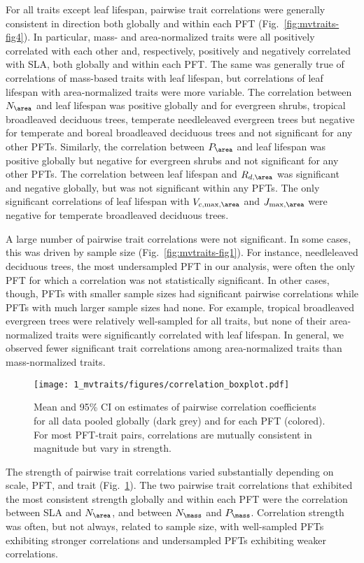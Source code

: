 For all traits except leaf lifespan, pairwise trait correlations were generally consistent in direction both globally and within each PFT (Fig.~\ref{fig:mvtraits-fig4}).
In particular, mass- and area-normalized traits were all positively correlated with each other and, respectively, positively and negatively correlated with SLA, both globally and within each PFT\@.
The same was generally true of correlations of mass-based traits with leaf lifespan, but correlations of leaf lifespan with area-normalized traits were more variable.
The correlation between $N_{\area}$ and leaf lifespan was positive globally and for evergreen shrubs, tropical broadleaved deciduous trees, temperate needleleaved evergreen trees but negative for temperate and boreal broadleaved deciduous trees and not significant for any other PFTs.
Similarly, the correlation between $P_{\area}$ and leaf lifespan was positive globally but negative for evergreen shrubs and not significant for any other PFTs.
The correlation between leaf lifespan and $R_{d,\area}$ was significant and negative globally, but was not significant within any PFTs.
The only significant correlations of leaf lifespan with $V_{c,\max,\area}$ and $J_{\max,\area}$ were negative for temperate broadleaved deciduous trees.

A large number of pairwise trait correlations were not significant.
In some cases, this was driven by sample size (Fig.~\ref{fig:mvtraits-fig1}).
For instance, needleleaved deciduous trees, the most undersampled PFT in our analysis, were often the only PFT for which a correlation was not statistically significant.
In other cases, though, PFTs with smaller sample sizes had significant pairwise correlations while PFTs with much larger sample sizes had none.
For example, tropical broadleaved evergreen trees were relatively well-sampled for all traits, but none of their area-normalized traits were significantly correlated with leaf lifespan.
In general, we observed fewer significant trait correlations among area-normalized traits than mass-normalized traits. 

\begin{figure}
  \centering
  \texttt{[image: 1\_mvtraits/figures/correlation\_boxplot.pdf]}
  \caption{%
    Mean and 95\% CI on estimates of pairwise correlation coefficients
    for all data pooled globally (dark grey) and for each PFT (colored).
    For most PFT-trait pairs, correlations are mutually consistent in magnitude but vary in strength.
  }\label{fig:mvtraits-fig5}
\end{figure}

The strength of pairwise trait correlations varied substantially depending on scale, PFT, and trait (Fig.~\ref{fig:mvtraits-fig5}).
The two pairwise trait correlations that exhibited the most consistent strength globally and within each PFT were the correlation between SLA and $N_{\area}$, and between $N_{\mass}$ and $P_{\mass}$.
Correlation strength was often, but not always, related to sample size, with well-sampled PFTs exhibiting stronger correlations and undersampled PFTs exhibiting weaker correlations.

